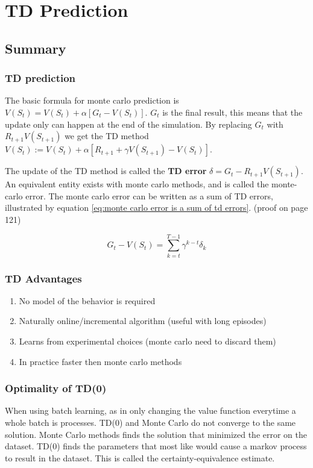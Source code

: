 \chapter{TD Prediction}

\section{Summary}

\subsection{TD prediction}

The basic formula for monte carlo prediction is $V(S_t)=V(S_t)+\alpha [G_t - V(S_t)]$. $G_t$ is the final result, this means that the update only can happen at the end of the simulation. By replacing $G_t$ with $R_{t+1} V(S_{t+1})$ we get the TD method $V(S_t) := V(S_t)+\alpha [R_{t+1} + \gamma V(S_{t+1}) - V(S_t)]$.

The update of the TD method is called the \textbf{TD error} $\delta = G_t - R_{t+1} V(S_{t+1})$. An equivalent entity exists with monte carlo methods, and is called the monte-carlo error. The monte carlo error can be written as a sum of TD errors, illustrated by equation \ref{eq:monte carlo error is a sum of td errors}. (proof on page 121)

\begin{equation}
G_t - V(S_t) = \sum_{k=t}^{T-1} \gamma^{k-t} \delta_k
\label{eq:monte carlo error is a sum of td errors}
\end{equation}

\subsection{TD Advantages}

\begin{enumerate}
	\item No model of the behavior is required
	\item Naturally online/incremental algorithm (useful with long episodes)
	\item Learns from experimental choices (monte carlo need to discard them)
	\item In practice faster then monte carlo methods
\end{enumerate}

\subsection{Optimality of TD(0)}
When using batch learning, as in only changing the value function everytime a whole batch is processes. TD(0) and Monte Carlo do not converge to the same solution. Monte Carlo methods finds the solution that minimized the error on the dataset. TD(0) finds the parameters that most like would cause a markov process to result in the dataset. This is called the certainty-equivalence estimate.

